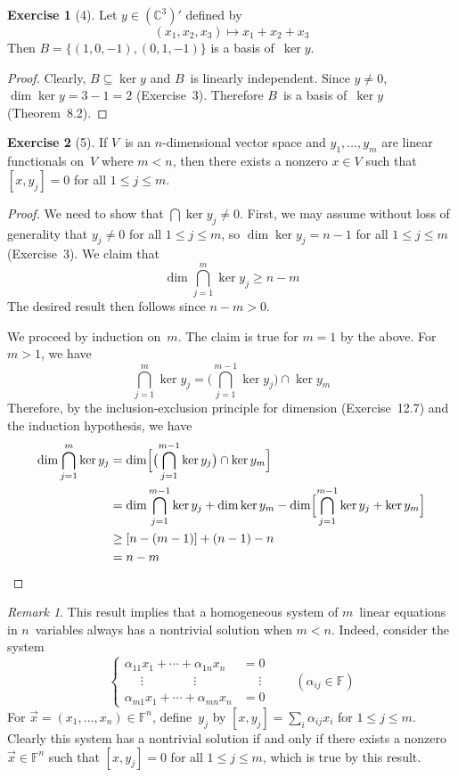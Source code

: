 \documentclass[letterpaper,12pt]{article}
\newcommand{\F}{\mathbb{F}}
\newcommand{\C}{\mathbb{C}}
\newcommand{\sect}{\cap}
\newcommand{\bigsect}{\bigcap}
\theoremstyle{definition}
\newtheorem*{exer}{Exercise}
\theoremstyle{remark}
\newtheorem*{rmk}{Remark}
\theoremstyle{direction}
\begin{document}
\begin{exer}[4]
Let \(y\in(\C^3)'\) defined by
\[(x_1,x_2,x_3)\mapsto x_1+x_2+x_3\]
Then \(B=\{(1,0,-1),(0,1,-1)\}\) is a basis of~\(\ker y\).
\end{exer}
\begin{proof}
Clearly, \(B\subseteq\ker y\) and \(B\)~is linearly independent. Since \(y\ne0\), \(\dim\ker y=3-1=2\) (Exercise~3). Therefore \(B\)~is a basis of~\(\ker y\) (Theorem~8.2).
\end{proof}

\begin{exer}[5]
If \(V\)~is an \(n\)-dimensional vector space and \(y_1,\ldots,y_m\) are linear functionals on~\(V\) where \(m<n\), then there exists a nonzero \(x\in V\) such that \([x,y_j]=0\) for all \(1\le j\le m\).
\end{exer}
\begin{proof}
We need to show that \(\bigsect\ker y_j\ne0\). First, we may assume without loss of generality that \(y_j\ne0\) for all \(1\le j\le m\), so \(\dim\ker y_j=n-1\) for all \(1\le j\le m\) (Exercise~3). We claim that
\[\dim\bigsect_{j=1}^m\ker y_j\ge n-m\]
The desired result then follows since \(n-m>0\).

We proceed by induction on~\(m\). The claim is true for \(m=1\) by the above. For \(m>1\), we have
\[\bigsect_{j=1}^m\ker y_j=\bigl(\bigsect_{j=1}^{m-1}\ker y_j\bigr)\sect\ker y_m\]
Therefore, by the inclusion-exclusion principle for dimension (Exercise~12.7) and the induction hypothesis, we have
\begin{align*}
\dim\bigsect_{j=1}^m\ker y_j&=\dim\Bigl[\bigl(\bigsect_{j=1}^{m-1}\ker y_j\bigr)\sect\ker y_m\Bigr]\\
	&=\dim\bigsect_{j=1}^{m-1}\ker y_j+\dim\ker y_m-\dim\Bigl[\bigsect_{j=1}^{m-1}\ker y_j+\ker y_m\Bigr]\\
	&\ge[n-(m-1)]+(n-1)-n\\
	&=n-m\qedhere
\end{align*}
\end{proof}
\begin{rmk}
This result implies that a homogeneous system of \(m\)~linear equations in \(n\)~variables always has a nontrivial solution when \(m<n\). Indeed, consider the system
\begin{equation*}
\left\lbrace
\begin{aligned}
\alpha_{11}x_1+\cdots+\alpha_{1n}x_n&=0\\
\phantom{\alpha_{i1}}\vdots\phantom{+\cdots+a_{in}}\vdots\phantom{x_{in}}&\phantom{=}\vdots\\
\alpha_{m1}x_1+\cdots+\alpha_{mn}x_n&=0
\end{aligned}
\right.\qquad(\alpha_{ij}\in\F)
\end{equation*}
For \(\vec{x}=(x_1,\ldots,x_n)\in\F^n\), define~\(y_j\) by \([x,y_j]=\sum_i\alpha_{ij}x_i\) for \(1\le j\le m\). Clearly this system has a nontrivial solution if and only if there exists a nonzero \(\vec{x}\in\F^n\) such that \([x,y_j]=0\) for all \(1\le j\le m\), which is true by this result.
\end{rmk}
\end{document}
